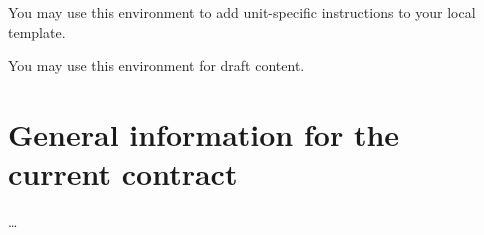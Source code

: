 %


\begin{extrainstructions}
  You may use this environment to add unit-specific instructions to your local
  template.
\end{extrainstructions}

\begin{draft}
  You may use this environment for draft content.
\end{draft}

\cite{DUMMY1}

\section{General information for the current contract}


\dots
